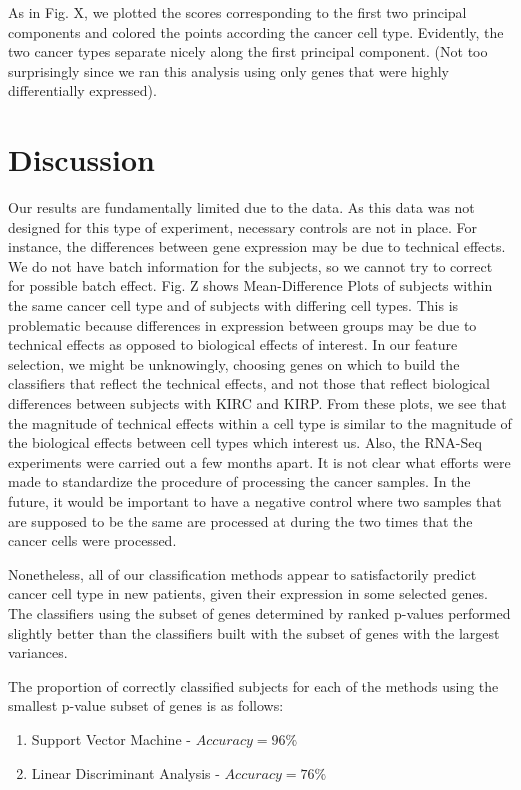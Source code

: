 As in Fig. X, we plotted the scores corresponding to the first two principal
components and colored the points according the cancer cell type. 
Evidently, the two cancer types separate nicely along the first
principal component. (Not too surprisingly since we ran this analysis using
only genes that were highly differentially expressed).  


\section{Discussion}

Our results are fundamentally limited due to the data. As this data was not
designed for this type of experiment, necessary controls are not in place. For
instance, the differences between gene expression may be due to technical
effects. We do not have batch information for the subjects, so we cannot try 
to correct for possible batch effect. Fig. Z shows Mean-Difference Plots of
subjects within the same cancer cell type and of subjects with differing cell types.
This is problematic because differences in expression between groups may be 
due to technical effects as opposed to biological effects of interest. In our feature 
selection, we might be unknowingly, choosing genes on which to build the classifiers
that reflect the technical effects, and not those that reflect biological differences between
subjects with KIRC and KIRP.
From these plots, we see that the magnitude of technical effects within a cell type
is similar to the magnitude of the biological effects between cell types which interest
us. Also, the RNA-Seq experiments were 
carried out a few months apart. It is not clear what efforts were made to 
standardize the procedure of processing the cancer samples. In the future, 
it would be important to have a negative control where two samples that are 
supposed to be the same are processed at during the two times that the cancer 
cells were processed. 

Nonetheless, all of our classification methods appear to satisfactorily predict 
cancer cell type in new patients, given their expression in some selected genes. The classifiers
using the subset of genes determined by ranked p-values performed slightly better than the classifiers
built with the subset of genes with the largest variances.

The proportion of correctly classified subjects for each of the methods using the smallest p-value subset of
genes is as follows:
\begin{enumerate}
\item Support Vector Machine - $Accuracy = 96\%$
\item Linear Discriminant Analysis - $Accuracy = 76\%$
\end{enumerate}

